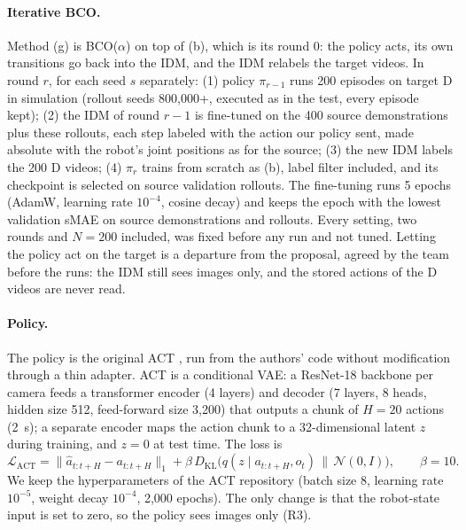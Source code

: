 \documentclass{article}
\begin{document}
\paragraph{Iterative BCO.}
Method (g) is BCO($\alpha$) \citep{torabi2018bco} on top of (b), which is its round 0: the
policy acts, its own transitions go back into the IDM, and the IDM relabels the target
videos. In round $r$, for each seed $s$ separately: (1) policy $\pi_{r-1}$ runs 200
episodes on target D in simulation (rollout seeds 800,000+, executed as in the test,
every episode kept); (2) the IDM of round $r-1$ is fine-tuned on the 400 source
demonstrations plus these rollouts, each step labeled with the action our policy sent,
made absolute with the robot's joint positions as for the source; (3) the new IDM labels
the 200 D videos; (4) $\pi_r$ trains from scratch as (b), label filter included, and its
checkpoint is selected on source validation rollouts. The fine-tuning runs 5 epochs (AdamW,
learning rate $10^{-4}$, cosine decay) and keeps the epoch with the lowest validation
sMAE on source demonstrations and rollouts. Every setting, two rounds and $N = 200$
included, was fixed before any run and not tuned. Letting the policy act on the target is
a departure from the proposal, agreed by the team before the runs: the IDM still sees
images only, and the stored actions of the D videos are never read.

\paragraph{Policy.}
The policy is the original ACT \citep{zhao2023act}, run from the authors' code without
modification through a thin adapter. ACT is a conditional VAE: a ResNet-18 backbone per
camera feeds a transformer encoder (4 layers) and decoder (7 layers, 8 heads, hidden
size 512, feed-forward size 3,200) that outputs a chunk of $H = 20$ actions (2~s); a
separate encoder maps the action chunk to a 32-dimensional latent $z$ during training,
and $z = 0$ at test time. The loss is
\begin{equation}
  \mathcal{L}_{\text{ACT}} = \big\| \hat{a}_{t:t+H} - a_{t:t+H} \big\|_1 +
  \beta \, D_{\mathrm{KL}}\big( q(z \mid a_{t:t+H}, o_t) \,\|\, \mathcal{N}(0, I) \big),
  \qquad \beta = 10 .
\end{equation}
We keep the hyperparameters of the ACT repository (batch size 8, learning rate
$10^{-5}$, weight decay $10^{-4}$, 2,000 epochs). The only change is that the robot-state
input is set to zero, so the policy sees images only (R3).
\end{document}
